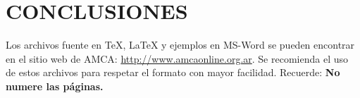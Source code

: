 \documentclass[oneside,a4paper,spanish,links]{amca}
\begin{document}
\section{CONCLUSIONES}

Los archivos fuente en TeX, \LaTeX{} y ejemplos en MS-Word se
pueden encontrar en el sitio web de AMCA:
\url{http://www.amcaonline.org.ar}. Se recomienda el uso de estos archivos para respetar el formato con mayor facilidad. Recuerde: {\bf No numere las
páginas.}

%

\end{document}
